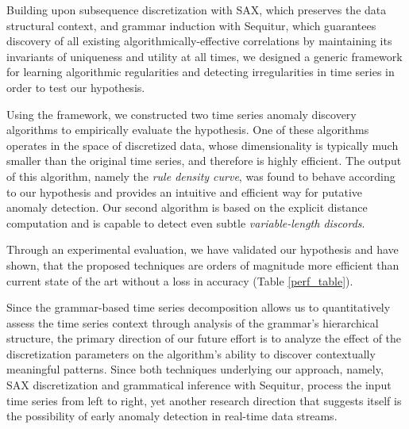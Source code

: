 \documentclass{sig-alternate}
\begin{document}
Building upon subsequence discretization with SAX, which preserves the data structural context, and grammar induction with Sequitur, which guarantees discovery of all existing algorithmically-effective correlations by maintaining its invariants of uniqueness and utility at all times, we designed a generic framework for learning algorithmic regularities and detecting irregularities in time series in order to test our hypothesis. 

Using the framework, we constructed two time series anomaly discovery algorithms to empirically evaluate the hypothesis. One of these algorithms operates in the space of discretized data, whose dimensionality is typically much smaller than the original time series, and therefore is highly efficient. The output of this algorithm, namely the \textit{rule density curve}, was found to behave according to our hypothesis and provides an intuitive and efficient way for putative anomaly detection. Our second algorithm is based on the explicit distance computation and is capable to detect even subtle \textit{variable-length discords}.

Through an experimental evaluation, we have validated our hypothesis and have shown, that the proposed techniques are orders of magnitude more efficient than current state of the art without a loss in accuracy (Table \ref{perf_table}).


Since the grammar-based time series decomposition allows us to quantitatively assess the time series context through analysis of the grammar's hierarchical structure, the primary direction of our future effort is to analyze the effect of the discretization parameters on the algorithm's ability to discover contextually meaningful patterns. Since both techniques underlying our approach, namely, SAX discretization and grammatical inference with Sequitur, process the input time series from left to right, yet another research direction that suggests itself is the possibility of early anomaly detection in real-time data streams.
\end{document}
